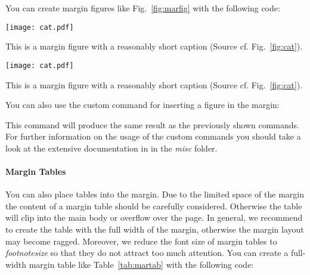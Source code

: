 You can create margin figures like Fig.~\ref{fig:marfig} with the following code:

\begin{marginfigure}[-5\baselineskip] %
\texttt{[image: cat.pdf]}
\caption{\label{fig:marfig}This is a margin figure with a reasonably short caption (Source cf. Fig.~\ref{fig:cat}).}
\end{marginfigure}

\begin{latex}
\begin{marginfigure}[-1\baselineskip] %
\texttt{[image: cat.pdf]}
\caption{\label{fig:marfig}This is a margin figure with a reasonably short caption (Source cf. Fig.~\ref{fig:cat}).}
\end{marginfigure}
\end{latex}

You can also use the custom command  for inserting a figure in the margin:

\begin{latex}
\end{latex}

This command will produce the same result as the previously shown commands.
For further information on the usage of the custom commands you should take a look at the extensive documentation in  in the \emph{misc} folder.

\paragraph{Margin Tables} You can also place tables into the margin. Due to the limited space of the margin the content of a margin table should be carefully considered. Otherwise the table will clip into the main body or overflow over the page. In general, we recommend to create the table with the full width of the margin, otherwise the margin layout may become ragged. Moreover, we reduce the font size of margin tables to \emph{footnotesize} so that they do not attract too much attention.
%
You can create a full-width margin table like Table~\ref{tab:martab} with the following code:

